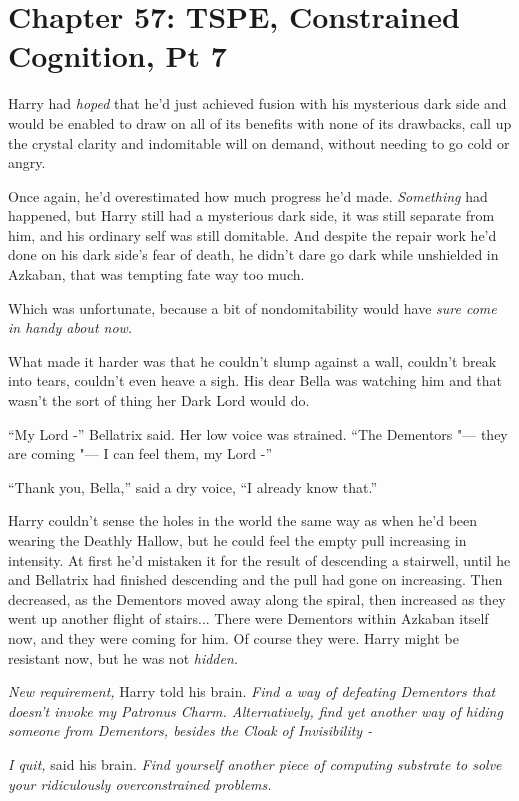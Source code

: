 \chapter{Chapter 57: TSPE, Constrained Cognition, Pt 7}
Harry had \emph{hoped} that he'd just achieved fusion with his
mysterious dark side and would be enabled to draw on all of its benefits
with none of its drawbacks, call up the crystal clarity and indomitable
will on demand, without needing to go cold or angry.

Once again, he'd overestimated how much progress he'd made.
\emph{Something} had happened, but Harry still had a mysterious dark
side, it was still separate from him, and his ordinary self was still
domitable. And despite the repair work he'd done on his dark side's fear
of death, he didn't dare go dark while unshielded in Azkaban, that was
tempting fate way too much.

Which was unfortunate, because a bit of nondomitability would have
\emph{sure come in handy about now.}

What made it harder was that he couldn't slump against a wall, couldn't
break into tears, couldn't even heave a sigh. His dear Bella was
watching him and that wasn't the sort of thing her Dark Lord would do.

``My Lord -'' Bellatrix said. Her low voice was strained. ``The
Dementors "--- they are coming "--- I can feel them, my Lord -''

``Thank you, Bella,'' said a dry voice, ``I already know that.''

Harry couldn't sense the holes in the world the same way as when he'd
been wearing the Deathly Hallow, but he could feel the empty pull
increasing in intensity. At first he'd mistaken it for the result of
descending a stairwell, until he and Bellatrix had finished descending
and the pull had gone on increasing. Then decreased, as the Dementors
moved away along the spiral, then increased as they went up another
flight of stairs... There were Dementors within Azkaban itself now,
and they were coming for him. Of course they were. Harry might be
resistant now, but he was not \emph{hidden.}

\emph{New requirement,} Harry told his brain. \emph{Find a way of
defeating Dementors that doesn't invoke my Patronus Charm.
Alternatively, find yet another way of hiding someone from Dementors,
besides the Cloak of Invisibility -}

\emph{I quit,} said his brain. \emph{Find yourself another piece of
computing substrate to solve your ridiculously overconstrained
problems.}

